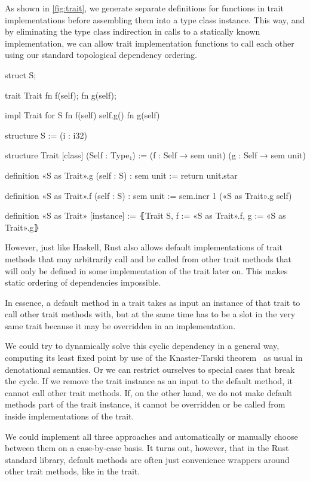 As shown in \autoref{fig:trait}, we generate separate definitions for functions in trait
implementations before assembling them into a type class instance. This way, and
by eliminating the type class indirection in calls to a statically known
implementation, we can allow trait implementation functions to call each other
using our standard topological dependency ordering.

\begin{sbs1}
struct S;

trait Trait {
  fn f(self);
  fn g(self);
}

impl Trait for S {
  fn f(self) {
    self.g()
  }
  fn g(self) {}
}
\end{sbs1}
\begin{sbs2}
structure S := (i : i32)

structure Trait [class] (Self : Type₁) :=
(f : Self → sem unit)
(g : Self → sem unit)

definition «S as Trait».g (self : S) : sem unit :=
return unit.star

definition «S as Trait».f (self : S) : sem unit :=
sem.incr 1 («S as Trait».g self)

definition «S as Trait» [instance] :=
⦃Trait S, f := «S as Trait».f, g := «S as Trait».g⦄
\end{sbs2}

However, just like Haskell, Rust also allows default implementations of trait
methods that may arbitrarily call and be called from other trait methods that
will only be defined in some implementation of the trait later on. This
makes static ordering of dependencies impossible.

In essence, a default method in a trait takes as input an instance of that trait
to call other trait methods with, but at the same time has to be a slot in the
very same trait because it may be overridden in an implementation.

We could try to dynamically solve this cyclic dependency in a general way, computing its least fixed point
by use of the Knaster-Tarski theorem~\cite{tarski1955lattice} as usual in
denotational semantics. Or we can restrict ourselves to special cases that break
the cycle. If we remove the trait instance as an input to the default method, it
cannot call other trait methods. If, on the other hand, we do not make default
methods part of the trait instance, it
cannot be overridden or be called from inside implementations of the trait.

We could implement all three approaches and automatically or manually choose
between them on a case-by-case basis. It turns out, however, that in the Rust standard library, default methods are often just
convenience wrappers around other trait methods, like in the  trait.

